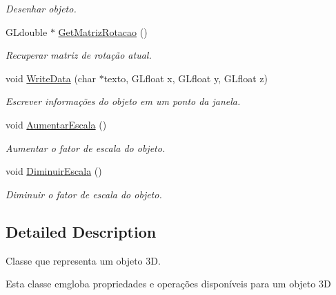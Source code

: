 \begin{DoxyCompactItemize}
\begin{DoxyCompactList}\small\item\em Desenhar objeto. \end{DoxyCompactList}\item 
G\+Ldouble $\ast$ \hyperlink{class_objeto3d_a1dff3d3ddcede978fce9e961c13b96d8}{Get\+Matriz\+Rotacao} ()
\begin{DoxyCompactList}\small\item\em Recuperar matriz de rotação atual. \end{DoxyCompactList}\item 
void \hyperlink{class_objeto3d_a95dbd1c265ace9c4596c4c96552f28e1}{Write\+Data} (char $\ast$texto, G\+Lfloat x, G\+Lfloat y, G\+Lfloat z)
\begin{DoxyCompactList}\small\item\em Escrever informações do objeto em um ponto da janela. \end{DoxyCompactList}\item 
\hypertarget{class_objeto3d_a97c8c05fd5f78c4c380e5b1e78fbd3f2}{void \hyperlink{class_objeto3d_a97c8c05fd5f78c4c380e5b1e78fbd3f2}{Aumentar\+Escala} ()}\label{class_objeto3d_a97c8c05fd5f78c4c380e5b1e78fbd3f2}

\begin{DoxyCompactList}\small\item\em Aumentar o fator de escala do objeto. \end{DoxyCompactList}\item 
\hypertarget{class_objeto3d_a33bae92d118504201e21e048355324a0}{void \hyperlink{class_objeto3d_a33bae92d118504201e21e048355324a0}{Diminuir\+Escala} ()}\label{class_objeto3d_a33bae92d118504201e21e048355324a0}

\begin{DoxyCompactList}\small\item\em Diminuir o fator de escala do objeto. \end{DoxyCompactList}\end{DoxyCompactItemize}


\subsection{Detailed Description}
Classe que representa um objeto 3\+D. 

Esta classe emgloba propriedades e operações disponíveis para um objeto 3\+D 

